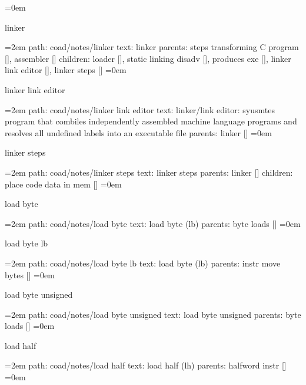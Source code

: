 \smallskip
\leftskip=0em
\par\endgroup
\bigskip
{}
linker
\smallskip
\par\begingroup
\leftskip=2em
path: coad/notes/linker
\smallskip
text:  linker
\smallskip
parents:  steps transforming C program [], assembler []
\smallskip
children: loader [], static linking disadv [], produces exe [], linker link editor [], linker steps []
\smallskip
\leftskip=0em
\par\endgroup
\bigskip
{}
linker link editor
\smallskip
\par\begingroup
\leftskip=2em
path: coad/notes/linker link editor
\smallskip
text:  linker/link editor: syusmtes program that combiles independently assembled machine language programs and resolves all undefined labels into an executable file
\smallskip
parents:  linker []
\smallskip
\leftskip=0em
\par\endgroup
\bigskip
{}
linker steps
\smallskip
\par\begingroup
\leftskip=2em
path: coad/notes/linker steps
\smallskip
text:  linker steps
\smallskip
parents:  linker []
\smallskip
children: place code data in mem []
\smallskip
\leftskip=0em
\par\endgroup
\bigskip
{}
load byte
\smallskip
\par\begingroup
\leftskip=2em
path: coad/notes/load byte
\smallskip
text:  load byte (lb)
\smallskip
parents:  byte loads []
\smallskip
\leftskip=0em
\par\endgroup
\bigskip
{}
load byte lb
\smallskip
\par\begingroup
\leftskip=2em
path: coad/notes/load byte lb
\smallskip
text:  load byte (lb)
\smallskip
parents:  instr move bytes []
\smallskip
\leftskip=0em
\par\endgroup
\bigskip
{}
load byte unsigned
\smallskip
\par\begingroup
\leftskip=2em
path: coad/notes/load byte unsigned
\smallskip
text:  load byte unsigned
\smallskip
parents:  byte loads []
\smallskip
\leftskip=0em
\par\endgroup
\bigskip
{}
load half
\smallskip
\par\begingroup
\leftskip=2em
path: coad/notes/load half
\smallskip
text:  load half (lh)
\smallskip
parents:  halfword instr []
\smallskip
\leftskip=0em
\par\endgroup
